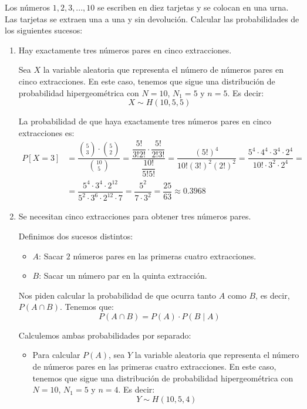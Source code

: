 \begin{ejercicio}
    Los números $1,2,3,...,10$ se escriben en diez tarjetas y se colocan en una urna. Las tarjetas se
    extraen una a una y sin devolución. Calcular las probabilidades de los siguientes sucesos:
    \begin{enumerate}
        \item Hay exactamente tres números pares en cinco extracciones.
        
        Sea $X$ la variable aleatoria que representa el número de números pares en cinco extracciones. En este caso, tenemos que sigue una distribución de probabilidad hipergeométrica con $N=10$, $N_1=5$ y $n=5$. Es decir:
        \begin{equation*}
            X \sim H(10,5,5)
        \end{equation*}

        La probabilidad de que haya exactamente tres números pares en cinco extracciones es:
        \begin{align*}
            P[X=3] &= \dfrac{\binom{5}{3} \cdot \binom{5}{2}}{\binom{10}{5}} = \dfrac{\dfrac{5!}{3!2!} \cdot \dfrac{5!}{2!3!}}{\dfrac{10!}{5!5!}} = \dfrac{(5!)^4}{10!(3!)^2(2!)^2} = \dfrac{5^4\cdot 4^4 \cdot 3^4 \cdot 2^4}{10!\cdot 3^2\cdot 2^4} =\\
            &= \dfrac{5^4\cdot 3^4 \cdot 2^{12}}{5^2\cdot 3^6\cdot 2^{12}\cdot 7} = \dfrac{5^2}{7\cdot 3^2} = \dfrac{25}{63} \approx 0.3968
        \end{align*}
        \item Se necesitan cinco extracciones para obtener tres números pares.
        
        Definimos dos sucesos distintos:
        \begin{itemize}
            \item $A$: Sacar $2$ números pares en las primeras cuatro extracciones.
            \item $B$: Sacar un número par en la quinta extracción.
        \end{itemize}

        Nos piden calcular la probabilidad de que ocurra tanto $A$ como $B$, es decir, $P(A\cap B)$. Tenemos que:
        \begin{equation*}
            P(A\cap B) = P(A)\cdot P(B\mid A)
        \end{equation*}

        Calculemos ambas probabilidades por separado:
        \begin{itemize}
            \item Para calcular $P(A)$, sea $Y$ la variable aleatoria que representa el número de números pares en las primeras cuatro extracciones. En este caso, tenemos que sigue una distribución de probabilidad hipergeométrica con $N=10$, $N_1=5$ y $n=4$. Es decir:
            \begin{equation*}
                Y \sim H(10,5,4)
            \end{equation*}


\end{itemize}
\end{enumerate}
\end{ejercicio}

